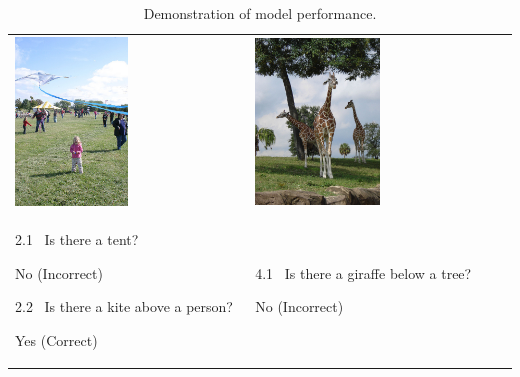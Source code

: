 \begin{table}
\begin{tabular}{p{}p{}}
	\includegraphics[width=0.5\textwidth]{vqa2.jpg} &
	\includegraphics[width=0.5\textwidth]{vqa4.jpg} \\

	2.1 \ Is there a tent?

	\qquad No (Incorrect)

	2.2 \ Is there a kite above a person?

	\qquad Yes (Correct) &

	4.1 \ Is there a giraffe below a tree?

	\qquad No (Incorrect)

\end{tabular}
\caption{Demonstration of model performance.}
\label{tab:demo}
\end{table}

